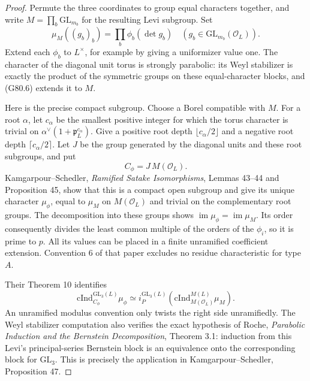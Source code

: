 \begin{proof}
Permute the three coordinates to group equal characters together, and
write \(M=\prod_b\mathrm{GL}_{m_b}\) for the resulting Levi subgroup.
Set
\[
 \mu_M((g_b)_b)=\prod_b\phi_b(\det g_b)
 \quad(g_b\in\mathrm{GL}_{m_b}(\mathcal O_L)).
                                                               \tag{G80.6}
\]
Extend each \(\phi_b\) to \(L^\times\), for example by giving a uniformizer
value one.  The character of the diagonal unit torus is strongly
parabolic: its Weyl stabilizer is exactly the product of the symmetric
groups on these equal-character blocks, and (G80.6) extends it to \(M\).

Here is the precise compact subgroup.  Choose a Borel compatible with
\(M\).  For a root \(\alpha\), let \(c_\alpha\) be the smallest positive
integer for which the torus character is trivial on
\(\alpha^\vee(1+\mathfrak p_L^{c_\alpha})\).
Give a positive root depth \(\lfloor c_\alpha/2\rfloor\) and a negative
root depth \(\lceil c_\alpha/2\rceil\).  Let \(J\) be the group generated
by the diagonal units and these root subgroups, and put
\[
             C_\phi=J\,M(\mathcal O_L).           \tag{G80.7}
\]
Kamgarpour--Schedler, \emph{Ramified Satake Isomorphisms},
Lemmas 43--44 and Proposition 45, show that this is a compact open
subgroup and give its unique character \(\mu_\phi\), equal to \(\mu_M\)
on \(M(\mathcal O_L)\) and trivial on the complementary root groups.
The decomposition into these groups shows
\(\operatorname{im}\mu_\phi=\operatorname{im}\mu_M\).
Its order consequently divides the least common multiple of the orders
of the \(\phi_i\), so it is prime to \(p\).  All its values can be placed
in a finite unramified coefficient extension.  Convention 6 of that
paper excludes no residue characteristic for type \(A\).

Their Theorem 10 identifies
\[
 \mathrm{cInd}_{C_\phi}^{\mathrm{GL}_3(L)}\mu_\phi
 \simeq i_P^{\mathrm{GL}_3(L)}
       \left(\mathrm{cInd}_{M(\mathcal O_L)}^{M(L)}\mu_M\right).
                                                               \tag{G80.8}
\]
An unramified modulus convention only twists the right side
unramifiedly.  The Weyl stabilizer computation also verifies the exact
hypothesis of Roche, \emph{Parabolic Induction and the Bernstein
Decomposition}, Theorem 3.1: induction from this Levi's principal-series
Bernstein block is an equivalence onto the corresponding block for
\(\mathrm{GL}_3\).  This is precisely the application in
Kamgarpour--Schedler, Proposition 47.


\end{proof}
